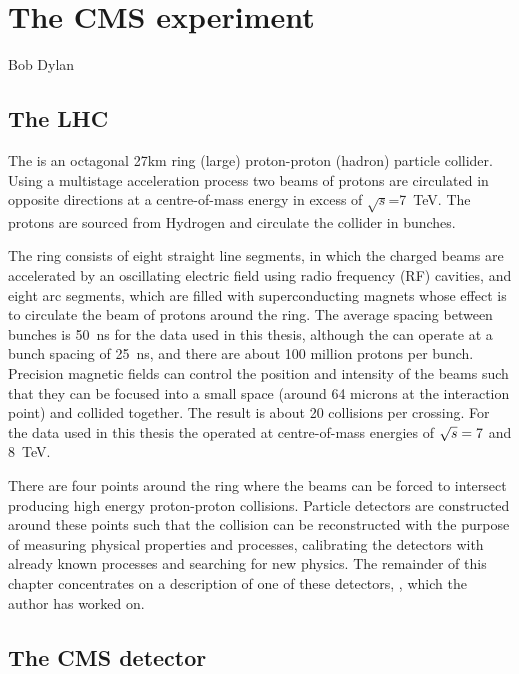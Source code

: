 \chapter{The CMS experiment}
\label{chap:cms}
{Bob Dylan}

\section{The LHC}

The \LHC is an octagonal 27km ring (large) proton-proton (hadron) particle collider. Using a multistage acceleration process two beams of protons are circulated in opposite directions at a centre-of-mass energy in excess of $\sqrt{s}$=7~TeV. The protons are sourced from Hydrogen and circulate the collider in bunches.  


The \LHC ring consists of eight straight line segments, in which the charged beams are accelerated by an oscillating electric field using radio frequency (RF) cavities, and eight arc segments, which are filled with superconducting magnets whose effect is to circulate the beam of protons around the ring. The average spacing between bunches is 50~ns for the data used in this thesis, although the \LHC can operate at a bunch spacing of 25~ns, and there are about 100 million protons per bunch. Precision magnetic fields can control the position and intensity of the beams such that they can be focused into a small space (around 64 microns at the interaction point) and collided together. The result is about 20 collisions per crossing. For the data used in this thesis the \LHC operated at centre-of-mass energies of $\sqrt{s}=7$ and 8~TeV. 

There are four points around the ring where the beams can be forced to intersect producing high energy proton-proton collisions. Particle detectors are constructed around these points such that the collision can be reconstructed with the purpose of measuring physical properties and processes, calibrating the detectors with already known processes and searching for new physics. The remainder of this chapter concentrates on a description of one of these detectors, \CMS, which the author has worked on.

\section{The CMS detector}

